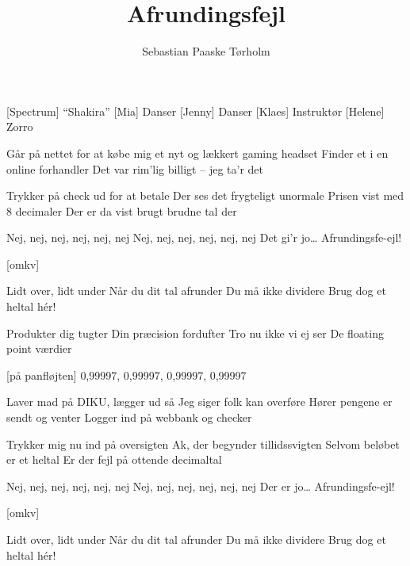 \documentclass[a4paper,11pt]{article}
\title{Afrundingsfejl}
\author{Sebastian Paaske Tørholm}
\begin{document}
\maketitle

\begin{roles}
    [Spectrum] ``Shakira''
    [Mia] Danser
    [Jenny] Danser
    [Klaes] Instruktør
    [Helene] Zorro
\end{roles}

\begin{song}

     {%
        Går på nettet for at købe mig et
        nyt og lækkert gaming headset
        Finder et i en online forhandler
        Det var rim’lig billigt -- jeg ta’r det

        Trykker på check ud for at betale
        Der ses det frygteligt unormale
        Prisen vist med 8 decimaler
        Der er da vist brugt brudne tal der
    }

     {%
        Nej, nej, nej, nej, nej, nej
        Nej, nej, nej, nej, nej, nej
        Det gi’r jo\ldots
        Afrundingsfe-ejl!
    } 

    [omkv] {
        Lidt over, lidt under
        Når du dit tal afrunder
        Du må ikke dividere
        Brug dog et heltal hér! 

        Produkter dig tugter
        Din præcision fordufter
        Tro nu ikke vi ej ser
        De floating point værdier
    }

    [på panfløjten] {
        0,99997, 0,99997, 0,99997, 0,99997 
    }

     {%
        Laver mad på DIKU, lægger ud så
        Jeg siger folk kan overføre
        Hører pengene er sendt og venter
        Logger ind på webbank og checker

        Trykker mig nu ind på oversigten
        Ak, der begynder tillidssvigten
        Selvom beløbet er et heltal
        Er der fejl på ottende decimaltal
    } 

     {%
        Nej, nej, nej, nej, nej, nej
        Nej, nej, nej, nej, nej, nej
        Der er jo\ldots
        Afrundingsfe-ejl!
    }

    [omkv] {
        Lidt over, lidt under
        Når du dit tal afrunder
        Du må ikke dividere
        Brug dog et heltal hér!

}
\end{song}
\end{document}
